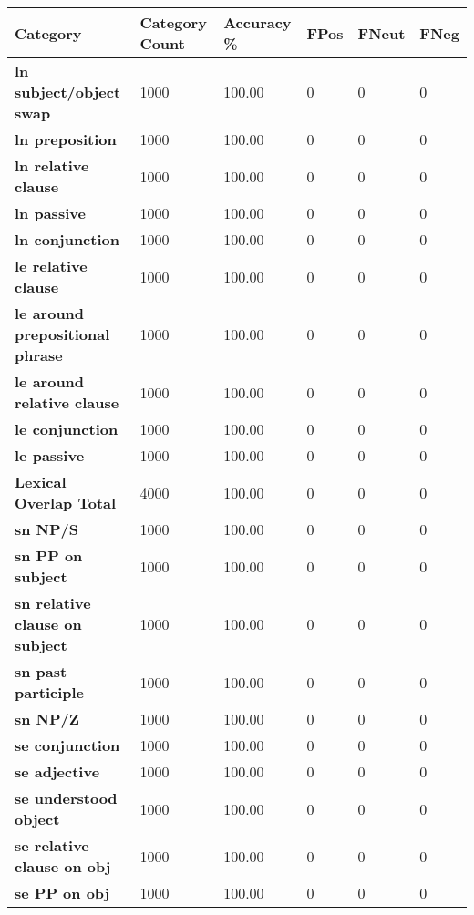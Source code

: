 \documentclass[11pt,a4paper]{article}
\begin{document}
\begin{table}[!hbt]
    \tiny
    \centering
    \begin{tabular}{p{}|p{} p{} p{} p{} p{} }
        \textbf{Category} & \textbf{Category Count} & \textbf{Accuracy \%} & \textbf{FPos} & \textbf{FNeut} & \textbf{FNeg} \\
        \hline
        \textbf{ln subject/object swap} & 1000 & 100.00 & 0 & 0 & 0 \\
        \textbf{ln preposition} & 1000 & 100.00 & 0 & 0 & 0 \\
        \textbf{ln relative clause} & 1000 & 100.00 & 0 & 0 & 0 \\
        \textbf{ln passive} & 1000 & 100.00 & 0 & 0 & 0 \\
        \textbf{ln conjunction} & 1000 & 100.00 & 0 & 0 & 0 \\
        \textbf{le relative clause} & 1000 & 100.00 & 0 & 0 & 0 \\
        \textbf{le around prepositional phrase} & 1000 & 100.00 & 0 & 0 & 0 \\
        \textbf{le around relative clause} & 1000 & 100.00 & 0 & 0 & 0 \\
        \textbf{le conjunction} & 1000 & 100.00 & 0 & 0 & 0 \\
        \textbf{le passive} & 1000 & 100.00 & 0 & 0 & 0 \\
        \textbf{Lexical Overlap Total} & 4000 & 100.00 & 0 & 0 & 0 \\
        \hline
        \textbf{sn NP/S} & 1000 & 100.00 & 0 & 0 & 0 \\
        \textbf{sn PP on subject} & 1000 & 100.00 & 0 & 0 & 0 \\
        \textbf{sn relative clause on subject} & 1000 & 100.00 & 0 & 0 & 0 \\
        \textbf{sn past participle} & 1000 & 100.00 & 0 & 0 & 0 \\
        \textbf{sn NP/Z} & 1000 & 100.00 & 0 & 0 & 0 \\
        \textbf{se conjunction} & 1000 & 100.00 & 0 & 0 & 0 \\
        \textbf{se adjective} & 1000 & 100.00 & 0 & 0 & 0 \\
        \textbf{se understood object} & 1000 & 100.00 & 0 & 0 & 0 \\
        \textbf{se relative clause on obj} & 1000 & 100.00 & 0 & 0 & 0 \\
        \textbf{se PP on obj} & 1000 & 100.00 & 0 & 0 & 0 \\

\end{tabular}
\end{table}
\end{document}
